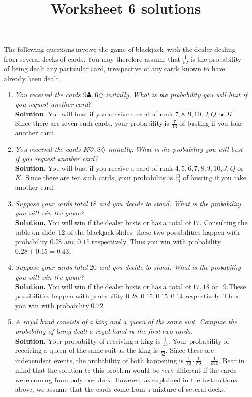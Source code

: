 \documentclass[12pt]{article}
\author{}\date{}
\title{Worksheet 6 solutions}\author{}
\begin{document}
\maketitle
\pagestyle{empty}
The following questions involve the game of blackjack,
with the dealer dealing from several decks of cards.
You may therefore assume that $\frac{1}{52}$ is the probability
of being dealt any particular card, irrespective of any cards
known to have already been dealt. 
\begin{enumerate}

\item{\em You received the cards $9\clubsuit,6\diamondsuit$
initially. What is the probability you will bust if
you request another card?}\\
{\bf Solution.} You will bust if you receive a card of rank
 $7,8,9,10,J,Q$ or $K$. Since there are seven such cards,
your probability is $\frac{7}{13}$ of busting if you take another card.

\item{\em You received the cards $K\heartsuit,8\diamondsuit$
initially. What is the probability you will bust if
you request another card?}\\
{\bf Solution.} You will bust if you receive a card of rank
 $4,5,6,7,8,9,10,J,Q$ or $K$. Since there are ten such cards,
your probability is $\frac{10}{13}$ of busting if you take another card.

\item{\em Suppose your cards total $18$ and you decide to stand.
What is the probability you will win the game?}\\
{\bf Solution.} You will win if the dealer busts or has a total of $17$.
Consulting the table on slide~12 of the blackjack slides, these
two possibilities happen with probability $0.28$ and $0.15$ respectively.
Thus you win with probability $0.28+0.15=0.43$.

\item{\em Suppose your cards total $20$ and you decide to stand.
What is the probability you will win the game?}\\
{\bf Solution.} You will win if the dealer busts or has a total of $17,18$
or $19$.These
possibilities happen with probability $0.28,0.15,0.15,0.14$ respectively.
Thus you win with probability $0.72$.

\item{\em A {\em royal hand} consists of a king and a queen
of the same suit. Compute the probability of being
dealt a royal hand in the first two cards.}\\
{\bf Solution.} Your probability of receiving a king is $\frac{1}{13}$.
Your probability of receiving a queen of the same suit as the king
is $\frac{1}{52}$. Since these are independent events,
the probability of both happening is
$\frac{1}{13}\cdot\frac{1}{52}=\frac{1}{676}$.
Bear in mind that the solution to this problem would be very
different if the cards were coming from only one deck. However,
as explained in the instructions above, we assume that the cards
come from a mixture of several decks.


\end{enumerate}
\end{document}
